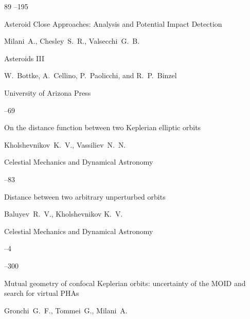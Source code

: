 \begin{thebibliography}{89}
--195





\paper Asteroid Close Approaches: Analysis and Potential Impact Detection

\by Milani~A., Chesley~S.~R., Valsecchi~G.~B.

\inbook Asteroids III  

\eds W.~Bottke, A.~Cellino, P.~Paolicchi, and R.~P.~Binzel

\publ University of Arizona Press


--69





\paper On the distance function between two Keplerian elliptic orbits

\by Kholshevnikov~K.~V., Vassiliev~N.~N.

\jour Celestial Mechanics and Dynamical Astronomy




--83






\paper Distance between two arbitrary unperturbed orbits

\by Baluyev~R.~V., Kholshevnikov K.~V.

\jour Celestial Mechanics and Dynamical Astronomy



--4

–300






\paper Mutual geometry of confocal Keplerian orbits: uncertainty of the MOID and search for virtual PHAs

\by Gronchi~G.~F., Tommei~G., Milani~A.


\end{thebibliography}
